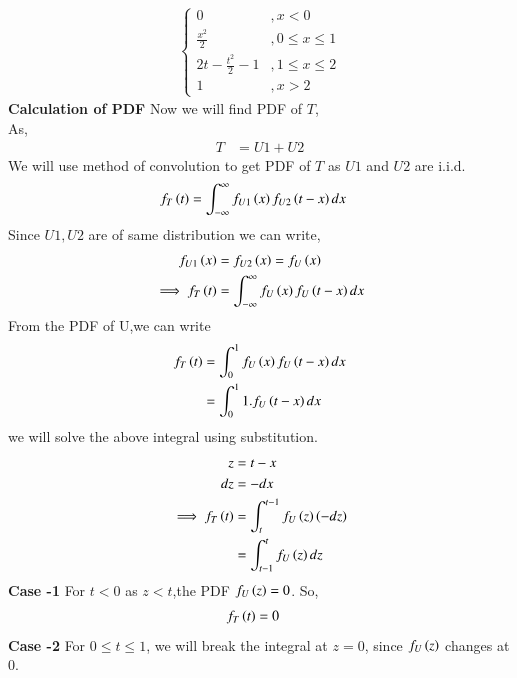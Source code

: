 \documentclass[journal,12pt,twocolumn]{IEEEtran}
\renewcommand\thesection{\arabic{section}}
\begin{document}
\begin{enumerate}[label=\thesection.\arabic*,ref=\thesection.\theenumi]
\begin{enumerate}[label=\thesection.\arabic*
,ref=\thesection.\theenumi]
\begin{align}
\begin{cases}
                                   0                      &,   x <0\\
                                \frac{x^{2}}{2}           &, 0\leq x \leq 1\\
                                2t - \frac{t^{2}}{2} - 1  &, 1 \leq x \leq 2\\
                                   1                      &,   x > 2
                              \end{cases}
    \end{align}      
 \textbf{Calculation of PDF}                
 Now we will find PDF of $T$,\\
 As,
   \begin{align}
           T &= U1 + U2
   \end{align}
  We will use method of convolution to get PDF of $T$ as $ U1$ and $U2$ are i.i.d.
   \begin{align}
          f_{T}\left(t\right) &= \int_{-\infty}^{\infty}f_{U1}\left(x\right)f_{U2}\left(t-x\right)dx
   \end{align}
  Since $ U1,U2$ are of same distribution we can write,
   \begin{align}
           f_{U1}\left(x\right) &= f_{U2}\left(x\right) = f_{U}\left(x\right)\\
           \implies f_{T}\left(t\right) &= \int_{-\infty}^{\infty}f_{U}\left(x\right)f_{U}\left(t-x\right)dx
   \end{align}
 From the PDF of U,we can write
  \begin{align}
          f_{T}\left(t\right) &= \int_{0}^{1}f_{U}\left(x\right)f_{U}\left(t-x\right)dx\\
                        &= \int_{0}^{1}1.f_{U}\left(t-x\right)dx\\
  \end{align}
  we will solve the above integral using substitution.
  \begin{align}
            z &= t-x \\
           dz &= -dx \\
          \implies f_{T}\left(t\right) &= \int_{t}^{t-1}f_{U}\left(z\right)\left(-dz\right)\\
                                 &= \int_{t-1}^{t}f_{U}\left(z\right)dz
  \end{align}
 \textbf{Case -1} For $ t<0 $ as $ z <t $,the PDF $ f_{U}\left(z\right) = 0 $. So,
  \begin{align}
          f_{T}\left(t\right) &= 0
  \end{align}
 \textbf{Case -2} For $ 0 \leq t \leq 1$, we will break the integral at $z = 0$, since $f_{U}\left(z\right)$ changes at 0.

\end{enumerate}
\end{enumerate}
\end{document}
